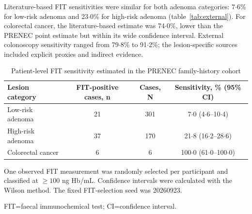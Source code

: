 \documentclass[10pt,a4paper]{article}
\renewcommand{\arraystretch}{1.12}
\newcommand{\dec}{\ensuremath{\cdot}}
\begin{document}
Literature-based FIT sensitivities were similar for both adenoma categories:
7\dec{}6\% for low-risk adenoma and 23\dec{}0\% for high-risk adenoma
(table~\ref{tab:external}). For colorectal cancer, the literature-based estimate was
74\dec{}0\%, lower than the PRENEC point estimate but within its wide
confidence interval. External colonoscopy sensitivity ranged from
79\dec{}8\% to 91\dec{}2\%; the lesion-specific sources included explicit
proxies and indirect evidence.

\begin{table}[p]
\centering
\caption{Patient-level FIT sensitivity estimated in the PRENEC
family-history cohort}
\label{tab:localfit}
\begin{threeparttable}
\small
\setlength{\tabcolsep}{7pt}
\renewcommand{\arraystretch}{1.15}
\begin{tabularx}{\linewidth}{@{}Y c c c@{}}
\toprule
\textbf{Lesion category} & \textbf{FIT-positive cases, n} &
\textbf{Cases, N} & \textbf{Sensitivity, \% (95\% CI)}\\
\midrule
Low-risk adenoma & 21 & 301 & 7\dec{}0 (4\dec{}6--10\dec{}4)\\
High-risk adenoma & 37 & 170 & 21\dec{}8 (16\dec{}2--28\dec{}6)\\
Colorectal cancer & 6 & 6 & 100\dec{}0 (61\dec{}0--100\dec{}0)\\
\bottomrule
\end{tabularx}
\begin{tablenotes}[flushleft]
\footnotesize
\item[] One observed FIT measurement was randomly selected per participant
and classified at $\geq100$ ng Hb/mL. Confidence intervals were calculated
with the Wilson method. The fixed FIT-selection seed was 20260923.
\item[] FIT=faecal immunochemical test; CI=confidence interval.
\end{tablenotes}
\end{threeparttable}
\end{table}
\end{document}
